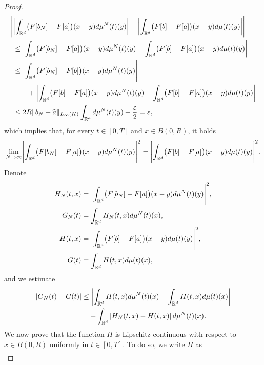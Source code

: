 \begin{proof}
	\begin{align*}
		\Biggl|
			&\biggl|\int_{\mathbb{R}^d}\bigl(F[ b_{N}]-F[a]\bigr)(x-y)d\mu^{N}(t)(y)\biggr|
				-\biggl|\int_{\mathbb{R}^d}\bigl(F[ b]-F[a]\bigr)(x-y)d\mu(t)(y)\biggr|\Biggr|\\
			&\leq\biggl|\int_{\mathbb{R}^d}\bigl(F[ b_{N}]-F[a]\bigr)(x-y)d\mu^{N}(t)(y)
					-\int_{\mathbb{R}^d}\bigl(F[ b]-F[a]\bigr)(x-y)d\mu(t)(y)\biggr|\\
			&\leq\Biggl|\int_{\mathbb{R}^d}
				\bigl(F[ b_{N}]-F[ b]\bigr)(x-y)d\mu^{N}(t)(y)\Biggr|\\
			&\qquad +\biggl|\int_{\mathbb{R}^d}\bigl(F[ b]-F[a]\bigr)(x-y)d\mu^{N}(t)(y)
					-\int_{\mathbb{R}^d}\bigl(F[ b]-F[a]\bigr)(x-y)d\mu(t)(y)\biggr|\\
			&\leq2R \| b_{N}-\widehat  a\|_{L_\infty(K)}\int_{\mathbb{R}^d}d\mu^{N}(t)(y)+\frac{\varepsilon}{2}=\varepsilon,
	\end{align*}
	which implies that, for every $t \in [0,T]$ and $x \in B(0,R)$, it holds
	\begin{align}\label{firstlim}
		\lim_{N\rightarrow\infty}\Biggl|\int_{\mathbb{R}^d}\bigl(F[ b_{N}]-F[a]\bigr)(x-y)d\mu^{N}(t)(y)\Biggr|^2
			=\Biggl|\int_{\mathbb{R}^d}\bigl(F[ b]-F[a]\bigr)(x-y)d\mu(t)(y)\Biggr|^2.
	\end{align}
	Denote
	\begin{align*}
		H_N(t,x)&=\Biggl|\int_{\mathbb{R}^d}\bigl(F[ b_{N}]-F[a]\bigr)(x-y)d\mu^{N}(t)(y)\Biggr|^2,\\
		G_N(t)&= \int_{\mathbb{R}^d}H_N(t,x)d\mu^N(t)(x),\\
		H(t,x)&= \Biggl|\int_{\mathbb{R}^d}\bigl(F[ b]-F[a]\bigr)(x-y)d\mu(t)(y)\Biggr|^2,\\
		G(t)&= \int_{\mathbb{R}^d}H(t,x)d\mu(t)(x),
	\end{align*}
	and we estimate
	\begin{align}
		|G_N(t)-G(t)|&\leq \left|\int_{\mathbb{R}^d}H(t,x)d\mu^N(t)(x) - \int_{\mathbb{R}^d}H(t,x)d\mu(t)(x)\right| \nonumber\\
		&\quad + \int_{\mathbb{R}^d}\left|H_N(t,x) - H(t,x)\right|d\mu^N(t)(x). \label{pippo3}
	\end{align}
	We now prove that the function $H$ is Lipschitz continuous with respect to $x \in B(0,R)$ uniformly in $t \in [0,T]$. To do so, we write $H$ as
	\begin{align*}

\end{align*}
\end{proof}
